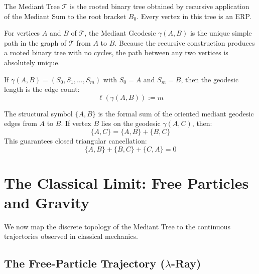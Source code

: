 \documentclass[11pt, letterpaper]{article}
\newcommand{\lop}{\lambda}
\begin{document}
The Mediant Tree $\mathcal{T}$ is the rooted binary tree obtained by recursive application of the Mediant Sum to the root bracket $B_0$. Every vertex in this tree is an ERP.

\begin{definition}\label{def:geodesic}
\begin{rsbox}
For vertices $A$ and $B$ of $\mathcal{T}$, the Mediant Geodesic $\gamma(A, B)$ is the unique simple path in the graph of $\mathcal{T}$ from $A$ to $B$.
Because the recursive construction produces a rooted binary tree with no cycles, the path between any two vertices is absolutely unique.
\end{rsbox}
\end{definition}

\begin{definition}\label{def:geodesic_length}
\begin{rsbox}
If $\gamma(A, B) = (S_0, S_1, \dots, S_m)$ with $S_0 = A$ and $S_m = B$, then the geodesic length is the edge count:
\[ \ell(\gamma(A, B)) := m \]
\end{rsbox}
\end{definition}

\begin{theorem}\label{thm:symbol_additivity}
\begin{rsbox}
The structural symbol $\{A, B\}$ is the formal sum of the oriented mediant geodesic edges from $A$ to $B$.
If vertex $B$ lies on the geodesic $\gamma(A, C)$, then:
\[ \{A, C\} = \{A, B\} + \{B, C\} \]
This guarantees closed triangular cancellation:
\[ \{A, B\} + \{B, C\} + \{C, A\} = 0 \]
\end{rsbox}
\end{theorem}

\section{The Classical Limit: Free Particles and Gravity}

We now map the discrete topology of the Mediant Tree to the continuous trajectories observed in classical mechanics.

\subsection{The Free-Particle Trajectory ($\lop$-Ray)}
\end{document}
